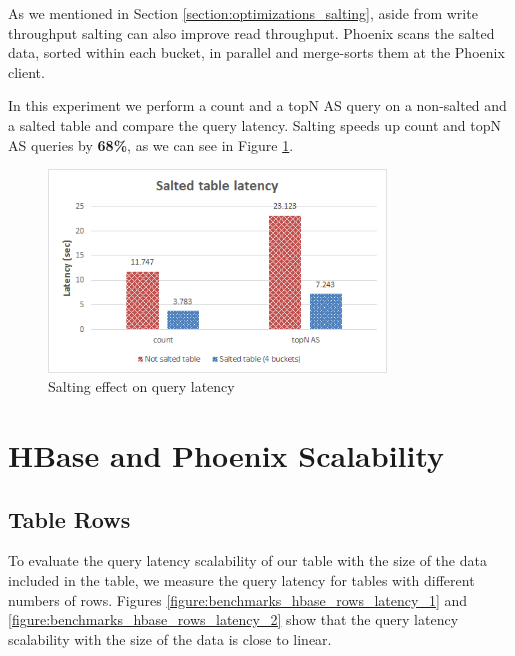 As we mentioned in Section \ref{section:optimizations_salting}, aside from write throughput salting can also improve read throughput. Phoenix scans the salted data, sorted within each bucket, in parallel and merge-sorts them at the Phoenix client.

In this experiment we perform a count and a topN AS query on a non-salted and a salted table and compare the query latency. Salting speeds up count and topN AS queries by \textbf{68\%}, as we can see in Figure \ref{figure:benchmarks_hbase_salting_latency}.

\begin{figure}[H]
\centering
\includegraphics[width=0.8\textwidth]{figures/benchmarks_hbase_salting_latency}
\caption{Salting effect on query latency}
\label{figure:benchmarks_hbase_salting_latency}
\end{figure}


\section{HBase and Phoenix Scalability}

\subsection{Table Rows}

To evaluate the query latency scalability of our table with the size of the data included in the table, we measure the query latency for tables with different numbers of rows. Figures \ref{figure:benchmarks_hbase_rows_latency_1} and \ref{figure:benchmarks_hbase_rows_latency_2} show that the query latency scalability with the size of the data is close to linear.

